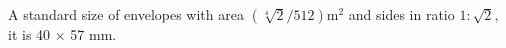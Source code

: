 A standard size of envelopes with area $ ( \sqrt[4]{2} /512 ) \mathrm{m} ^2 $ 
and sides in ratio $ 1 : \sqrt{2} , $ it is 40 \ensuremath{ \times } 57   mm.